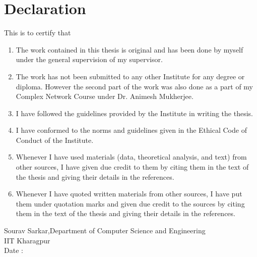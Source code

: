 \documentclass{article}
\begin{document}

\clearpage
\section*{Declaration}

This is to certify that
\begin{enumerate}
\item The work contained in this thesis is original and has been done by myself under the
general supervision of my supervisor.

\item The work has not been submitted to any other Institute for any degree or diploma. However the second part of the work was also done as a part of my Complex Network Course under Dr. Animesh Mukherjee.

\item I have followed the guidelines provided by the Institute in writing the thesis.

\item I have conformed to the norms and guidelines given in the Ethical Code of Conduct
of the Institute.

\item Whenever I have used materials (data, theoretical analysis, and text) from other
sources, I have given due credit to them by citing them in the text of the thesis and
giving their details in the references.

\item Whenever I have quoted written materials from other sources, I have put them under
quotation marks and given due credit to the sources by citing them in the text of
the thesis and giving their details in the references.
\end{enumerate}
\vspace{2cm}
Sourav Sarkar,Department of Computer Science and Engineering\\
IIT Kharagpur\\
Date :\\

\clearpage



\medskip
 


\end{document}
